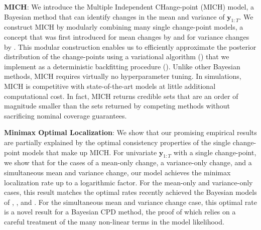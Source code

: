 \textbf{MICH}: %
We introduce the Multiple Independent CHange-point (MICH) model, a Bayesian method that can identify changes in the mean and variance of $\mathbf{y}_{1:T}$. We construct MICH by modularly combining many single change-point models, a concept that was first introduced for mean changes by \cite{Wang20} and for variance changes by \cite{Cappello22}. This modular construction enables us to efficiently approximate the posterior distribution of the change-points using a variational algorithm (\citealp{Jordan99, Blei17}) that we implement as a deterministic backfitting procedure (\citealp{Breiman85}). Unlike other Bayesian methods, MICH requires virtually no hyperparameter tuning. In simulations, MICH is competitive with state-of-the-art models at little additional computational cost. In fact, MICH returns credible sets that are an order of magnitude smaller than the sets returned by competing methods without sacrificing nominal coverage guarantees.


\textbf{Minimax Optimal Localization}: We show that our promising empirical results are partially explained by the optimal consistency properties of the single change-point models that make up MICH. For univariate $\mathbf{y}_{1:T}$ with a single change-point, we show that for the cases of a mean-only change, a variance-only change, and a simultaneous mean and variance change, our model achieves the minimax localization rate up to a logarithmic factor. For the mean-only and variance-only cases, this result matches the optimal rates recently achieved the Bayesian models of \cite{Liu17}, \cite{Cappello21}, and \cite{Kim24}. For the simultaneous mean and variance change case, this optimal rate is a novel result for a Bayesian CPD method, the proof of which relies on a careful treatment of the many non-linear terms in the model likelihood.

